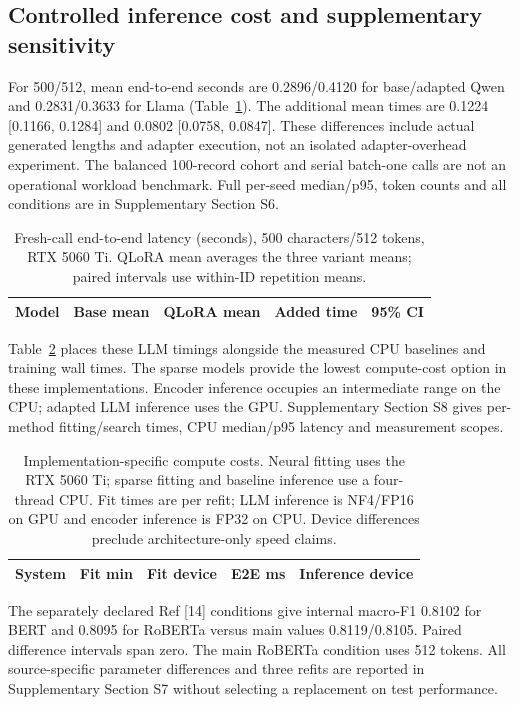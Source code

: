 \documentclass{elektr}
\begin{document}
\subsection{Controlled inference cost and supplementary sensitivity}
\label{sec:cost-results}
For 500/512, mean end-to-end seconds are 0.2896/0.4120 for base/adapted Qwen and 0.2831/0.3633 for Llama (Table~\ref{tab:latency}). The additional mean times are 0.1224 [0.1166, 0.1284] and 0.0802 [0.0758, 0.0847]. These differences include actual generated lengths and adapter execution, not an isolated adapter-overhead experiment. The balanced 100-record cohort and serial batch-one calls are not an operational workload benchmark. Full per-seed median/p95, token counts and all conditions are in Supplementary Section S6.
\begin{table}[htbp]
\caption{Fresh-call end-to-end latency (seconds), 500 characters/512 tokens, RTX 5060 Ti. QLoRA mean averages the three variant means; paired intervals use within-ID repetition means.}
\label{tab:latency}\centering\small
\begin{tabular}{lrrrr}\hline
Model & Base mean & QLoRA mean & Added time & 95\% CI\\\hline

\end{tabular}
\end{table}

Table~\ref{tab:compute-cost} places these LLM timings alongside the measured CPU baselines and training wall times. The sparse models provide the lowest compute-cost option in these implementations. Encoder inference occupies an intermediate range on the CPU; adapted LLM inference uses the GPU. Supplementary Section S8 gives per-method fitting/search times, CPU median/p95 latency and measurement scopes.
\begin{table}[htbp]
\caption{Implementation-specific compute costs. Neural fitting uses the RTX 5060 Ti; sparse fitting and baseline inference use a four-thread CPU. Fit times are per refit; LLM inference is NF4/FP16 on GPU and encoder inference is FP32 on CPU. Device differences preclude architecture-only speed claims.}
\label{tab:compute-cost}\centering\small
\begin{tabular}{lrrrr}\hline
System & Fit min & Fit device & E2E ms & Inference device\\\hline

\end{tabular}
\end{table}

The separately declared Ref [14] conditions give internal macro-F1 0.8102 for BERT and 0.8095 for RoBERTa versus main values 0.8119/0.8105. Paired difference intervals span zero. The main RoBERTa condition uses 512 tokens. All source-specific parameter differences and three refits are reported in Supplementary Section S7 without selecting a replacement on test performance.
\end{document}
